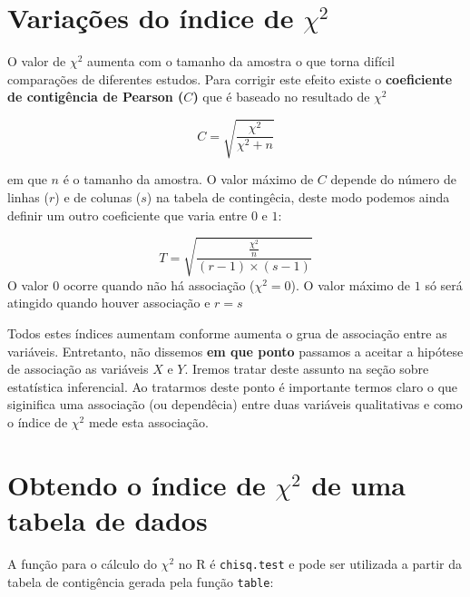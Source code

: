 \documentclass[
]{book}
\newenvironment{Shaded}{\begin{snugshade}}{\end{snugshade}}
\newcommand{\FunctionTok}[1]{\textcolor[rgb]{0.00,0.00,0.00}{#1}}
\newcommand{\NormalTok}[1]{#1}
\newcommand{\OtherTok}[1]{\textcolor[rgb]{0.56,0.35,0.01}{#1}}
\newcommand{\SpecialCharTok}[1]{\textcolor[rgb]{0.00,0.00,0.00}{#1}}
\begin{document}
\hypertarget{variauxe7uxf5es-do-uxedndice-de-chi2}{%
\section{\texorpdfstring{Variações do índice de \(\chi^2\)}{Variações do índice de \textbackslash chi\^{}2}}\label{variauxe7uxf5es-do-uxedndice-de-chi2}}

O valor de \(\chi^2\) aumenta com o tamanho da amostra o que torna difícil comparações de diferentes estudos. Para corrigir este efeito existe o \textbf{coeficiente de contigência de Pearson (\(C\))} que é baseado no resultado de \(\chi^2\)

\[C = \sqrt{\frac{\chi^2}{\chi^2 + n}}\]

em que \(n\) é o tamanho da amostra. O valor máximo de \(C\) depende do número de linhas (\(r\)) e de colunas (\(s\)) na tabela de contingêcia, deste modo podemos ainda definir um outro coeficiente que varia entre \(0\) e \(1\):

\[T = \sqrt{\frac{\frac{\chi^2}{n}}{(r-1) \times (s-1)}}\]
O valor \(0\) ocorre quando não há associação (\(\chi^2 = 0\)). O valor máximo de \(1\) só será atingido quando houver associação e \(r = s\)

Todos estes índices aumentam conforme aumenta o grua de associação entre as variáveis. Entretanto, não dissemos \textbf{em que ponto} passamos a aceitar a hipótese de associação as variáveis \(X\) e \(Y\). Iremos tratar deste assunto na seção sobre estatística inferencial. Ao tratarmos deste ponto é importante termos claro o que siginifica uma associação (ou dependêcia) entre duas variáveis qualitativas e como o índice de \(\chi^2\) mede esta associação.

\hypertarget{obtendo-o-uxedndice-de-chi2-de-uma-tabela-de-dados}{%
\section{\texorpdfstring{Obtendo o índice de \(\chi^2\) de uma tabela de dados}{Obtendo o índice de \textbackslash chi\^{}2 de uma tabela de dados}}\label{obtendo-o-uxedndice-de-chi2-de-uma-tabela-de-dados}}

A função para o cálculo do \(\chi^2\) no R é \texttt{chisq.test} e pode ser utilizada a partir da tabela de contigência gerada pela função \texttt{table}:

\begin{Shaded}
\end{Shaded}
\end{document}
